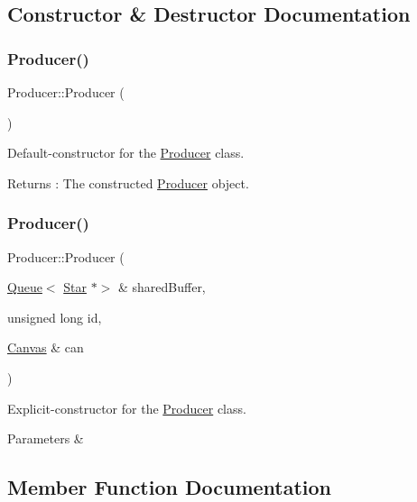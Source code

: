 \subsection{Constructor \& Destructor Documentation}
\mbox{\label{class_producer_ab79ff8b19e682d144e40044485cb81b8}} 
\subsubsection{\texorpdfstring{Producer()}{Producer()}\hspace{0.1cm}{\footnotesize\ttfamily [1/2]}}
{\footnotesize\ttfamily Producer\+::\+Producer (\begin{DoxyParamCaption}{ }\end{DoxyParamCaption})}

Default-\/constructor for the \hyperlink{class_producer}{Producer} class. \begin{DoxyReturn}{Returns}
\+: The constructed \hyperlink{class_producer}{Producer} object. 
\end{DoxyReturn}
\mbox{\label{class_producer_abfb6f8afcc08bdd27e6451c8ae5b0129}} 
\subsubsection{\texorpdfstring{Producer()}{Producer()}\hspace{0.1cm}{\footnotesize\ttfamily [2/2]}}
{\footnotesize\ttfamily Producer\+::\+Producer (\begin{DoxyParamCaption}\item[{\hyperlink{class_queue}{Queue}$<$ \hyperlink{classtsgl_1_1_star}{Star} $\ast$$>$ \&}]{shared\+Buffer,  }\item[{unsigned long}]{id,  }\item[{\hyperlink{classtsgl_1_1_canvas}{Canvas} \&}]{can }\end{DoxyParamCaption})}

Explicit-\/constructor for the \hyperlink{class_producer}{Producer} class. 
\begin{DoxyParams}{Parameters}
{\em } & \\
\hline
\end{DoxyParams}


\subsection{Member Function Documentation}
\mbox{\label{class_producer_a40820fecb39439fac7a4f7b4227d4d1d}} 
